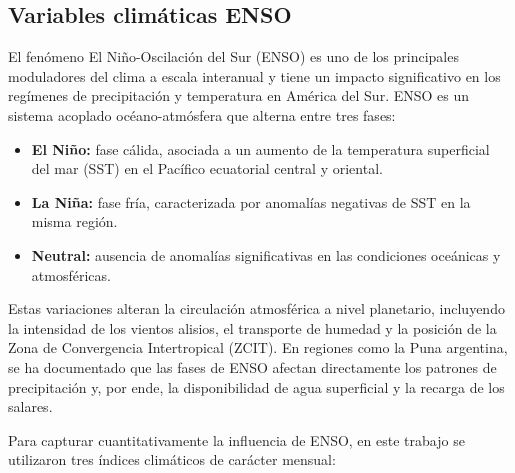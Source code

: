 \subsection*{Variables climáticas ENSO}

El fenómeno El Niño-Oscilación del Sur (ENSO) es uno de los principales moduladores del clima a escala interanual y tiene un impacto significativo en los regímenes de precipitación y temperatura en América del Sur. ENSO es un sistema acoplado océano-atmósfera que alterna entre tres fases:

\begin{itemize}
    \item \textbf{El Niño:} fase cálida, asociada a un aumento de la temperatura superficial del mar (SST) en el Pacífico ecuatorial central y oriental.
    \item \textbf{La Niña:} fase fría, caracterizada por anomalías negativas de SST en la misma región.
    \item \textbf{Neutral:} ausencia de anomalías significativas en las condiciones oceánicas y atmosféricas.
\end{itemize}

Estas variaciones alteran la circulación atmosférica a nivel planetario, incluyendo la intensidad de los vientos alisios, el transporte de humedad y la posición de la Zona de Convergencia Intertropical (ZCIT). En regiones como la Puna argentina, se ha documentado que las fases de ENSO afectan directamente los patrones de precipitación y, por ende, la disponibilidad de agua superficial y la recarga de los salares.

Para capturar cuantitativamente la influencia de ENSO, en este trabajo se utilizaron tres índices climáticos de carácter mensual:

